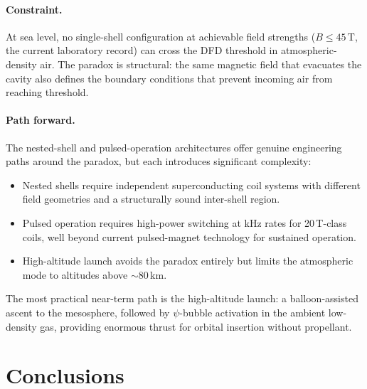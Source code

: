 \documentclass[12pt,twocolumn]{article}
\begin{document}
\paragraph{Constraint.}
At sea level, no single-shell configuration at achievable field
strengths ($B \leq 45$\,T, the current laboratory record) can cross
the DFD threshold in atmospheric-density air. The paradox is
structural: the same magnetic field that evacuates the cavity also
defines the boundary conditions that prevent incoming air from
reaching threshold.

\paragraph{Path forward.}
The nested-shell and pulsed-operation architectures offer genuine
engineering paths around the paradox, but each introduces significant
complexity:
\begin{itemize}[nosep]
  \item Nested shells require independent superconducting coil systems
        with different field geometries and a structurally sound
        inter-shell region.
  \item Pulsed operation requires high-power switching at kHz rates
        for 20\,T-class coils, well beyond current pulsed-magnet
        technology for sustained operation.
  \item High-altitude launch avoids the paradox entirely but limits
        the atmospheric mode to altitudes above $\sim$80\,km.
\end{itemize}

The most practical near-term path is the high-altitude launch: a
balloon-assisted ascent to the mesosphere, followed by $\psi$-bubble
activation in the ambient low-density gas, providing enormous thrust
for orbital insertion without propellant.

\section{Conclusions}
\label{sec:conclusions}
\end{document}
